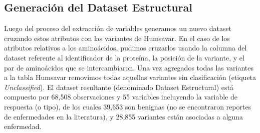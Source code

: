 

\subsection{Generación del Dataset Estructural}

Luego del proceso del extracción de variables generamos un nuevo dataset cruzando estos atributos con las variantes de Humsavar. En el caso de los atributos relativos a los aminoácidos, pudimos cruzarlos usando la columna del dataset referente al identificador de la proteína, la posición de la variante, y el par de aminoácidos que se intercambiaron. Una vez agregados todas las variantes a la tabla Humsavar removimos todas aquellas variantes sin clasificación (etiqueta \textit{Unclassified}). El dataset resultante (denominado Dataset Estructural) está compuesto por 68,508 observaciones y 55 variables incluyendo la variable de respuesta (o tipo), de los cuales 39,653 son benignas (no se encontraron reportes de enfermedades en la literatura), y 28,855 variantes están asociadas a alguna enfermedad. 

